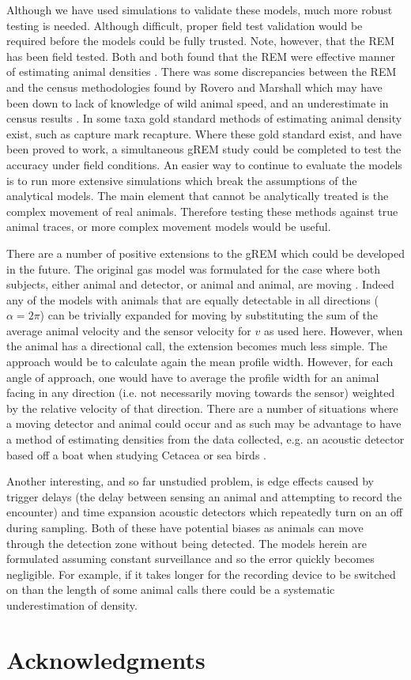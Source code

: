 \documentclass[a4paper,10pt,reqno,oneside]{amsart}
\begin{document}
Although we have used simulations to validate these models, much more robust testing is needed. Although difficult, proper field test validation would be required before the models could be fully trusted. Note, however, that the REM \citep{rowcliffe2008estimating} has been field tested. Both \citet{rowcliffe2008estimating} and \citet{zero2013monitoring} both found that the REM were effective manner of estimating animal densities \citep{rowcliffe2008estimating, zero2013monitoring}. There was some discrepancies between the REM and the census methodologies found by Rovero and Marshall which may have been down to lack of knowledge of wild animal speed, and an underestimate in census results \citep{rovero2009camera}. In some taxa gold standard methods of estimating animal density exist, such as capture mark recapture. Where these gold standard exist, and have been proved to work, a simultaneous gREM study could be completed to test the accuracy under field conditions. An easier way to continue to evaluate the models is to run more extensive simulations which break the assumptions of the analytical models. The main element that cannot be analytically treated is the complex movement of real animals. Therefore testing these methods against true animal traces, or more complex movement models would be useful.


There are a number of positive extensions to the gREM which could be developed in the future. The original gas model was formulated for the case where both subjects, either animal and detector, or animal and animal, are moving \citep{Hutchinson_Waser_2007}. Indeed any of the models with animals that are equally detectable in all directions ($\alpha = 2\pi$) can be trivially expanded for moving by substituting the sum of the average animal velocity and the sensor velocity for $v$ as used here. However, when the animal has a directional call, the extension becomes much less simple. The approach would be to calculate again the mean profile width. However, for each angle of approach, one would have to average the profile width for an animal facing in any direction (i.e. not necessarily moving towards the sensor) weighted by the relative velocity of that direction. There are a number of situations where a moving detector and animal could occur and as such may be advantage to have a method of estimating densities from the data collected, e.g. an acoustic detector based off a boat when studying Cetacea or sea birds \citep{yack2013passive}.

Another interesting, and so far unstudied problem, is edge effects caused by trigger delays (the delay between sensing an animal and attempting to record the encounter) and time expansion acoustic detectors which repeatedly turn on an off during sampling. Both of these have potential biases as animals can move through the detection zone without being detected. The models herein are formulated assuming constant surveillance and so the error quickly becomes negligible. For example, if it takes longer for the recording device to be switched on than the length of some animal calls there could be a systematic underestimation of density. 

\section{Acknowledgments}



	
	
\end{document}
